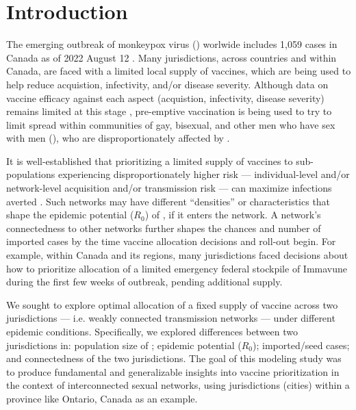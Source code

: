 \section{Introduction}
The emerging outbreak of monkeypox virus (\MPXV) worlwide includes
1,059 cases in Canada as of 2022 August 12 \cite{PHAC2022epi}.
Many jurisdictions, across countries and within Canada,
are faced with a limited local supply of vaccines,
which are being used to help reduce acquistion, infectivity, and/or disease severity.
Although data on vaccine efficacy against each aspect (acquistion, infectivity, disease severity)
remains limited at this stage \cite{Fine1988,PHAC2022imvamune,CDC2022vax},
pre-emptive vaccination is being used to try to limit \MPXV spread
within communities of gay, bisexual, and other men who have sex with men (\GBMSM),
who are disproportionately affected by \MPXV.
\par
It is well-established that prioritizing a limited supply of vaccines
to sub-populations experiencing disproportionately higher risk
--- individual-level and/or network-level acquisition and/or transmission risk ---
can maximize infections averted \cite{Garnett2005,Mishra2021}.
Such networks may have different ``densities'' or characteristics that shape
the epidemic potential ($R_0$) of \MPXV, if it enters the network.
A network's connectedness to other networks further shapes
the chances and number of imported cases
by the time vaccine allocation decisions and roll-out begin.
For example, within Canada and its regions, many jurisdictions
faced decisions about how to prioritize allocation of
a limited emergency federal stockpile of Immavune\rtm \cite{PHAC2022imvamune}
during the first few weeks of \MPXV outbreak, pending additional supply.
\par
We sought to explore optimal allocation of a fixed supply of \MPXV vaccine
across two jurisdictions --- i.e. weakly connected transmission networks ---
under different epidemic conditions.
Specifically, we explored differences between two jurisdictions in:
population size of \GBMSM; epidemic potential ($R_0$); imported/seed cases;
and connectedness of the two jurisdictions.
The goal of this modeling study was to produce fundamental and generalizable insights into
\MPXV vaccine prioritization in the context of interconnected sexual networks,
using jurisdictions (cities) within a province like Ontario, Canada as an example.